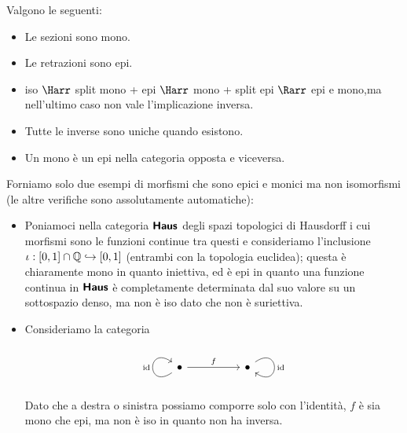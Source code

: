 \documentclass{article}
\begin{document}
\begin{remark}{}{}
    Valgono le seguenti:\begin{itemize}
        \item Le sezioni sono mono.
        \item Le retrazioni sono epi.
        \item iso $\Harr$ split mono + epi $\Harr$ mono + split epi $\Rarr$ epi e mono,ma nell'ultimo caso non vale l'implicazione inversa.
        \item Tutte le inverse sono uniche quando esistono.
        \item Un mono è un epi nella categoria opposta e viceversa.
    \end{itemize}
    \proof 
    Forniamo solo due esempi di morfismi che sono epici e monici ma non isomorfismi (le altre verifiche sono assolutamente automatiche):\begin{itemize}
        \item Poniamoci nella categoria $\text{\sffamily\textbf{Haus}}$ degli spazi topologici di Hausdorff i cui morfismi sono le funzioni continue tra questi e consideriamo l'inclusione $\iota: [0,1]\cap \mathbb{Q}\hookrightarrow[0,1]$ (entrambi con la topologia euclidea); questa è chiaramente mono in quanto iniettiva, ed è epi in quanto una funzione continua in $\text{\sffamily\textbf{Haus}}$ è completamente determinata dal suo valore su un sottospazio denso, ma non è iso dato che non è suriettiva.
        \item Consideriamo la categoria
        \[\begin{tikzcd}
        	\bullet && \bullet
    	    \arrow["\id", from=1-1, to=1-1, loop, in=145, out=215, distance=10mm]
        	\arrow["f", from=1-1, to=1-3]
    	    \arrow["\id", from=1-3, to=1-3, loop, in=325, out=35, distance=10mm]
        \end{tikzcd}\]
        Dato che a destra o sinistra possiamo comporre solo con l'identità, $f$ è sia mono che epi, ma non è iso in quanto non ha inversa.
    \end{itemize}
\end{remark}
\end{document}
